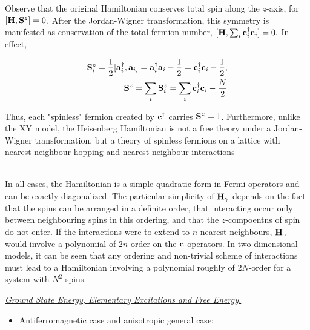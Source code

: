 \documentclass{homework}
\begin{document}
\begin{tcolorbox}[colback = yellow, title = Physical Context]

Observe that the original Hamiltonian conserves total spin along the $z$-axis, for $[{\bf H}, {\bf S}^z] = 0$. After the Jordan-Wigner transformation, this symmetry is manifested as conservation of the total fermion number, $[{\bf H}, \sum_{i} {\bf c}_i^\dagger {\bf c}_i] = 0.$ 
In effect, 

\begin{equation}
    \begin{split}
        {\bf S}_i^z = \frac{1}{2} [{\bf a}_i^\dagger, {\bf a}_i] = {\bf a}_i^\dagger {\bf a}_i - \frac{1}{2} = {\bf c}_i^\dagger {\bf c}_i - \frac{1}{2}, \\
        {\bf S}^z = \sum_{i} {\bf S}_i^z = \sum_{i} {\bf c}_i^\dagger {\bf c}_i - \frac{N}{2}
    \end{split}
\end{equation}

Thus, each "spinless" fermion created by ${\bf c}^\dagger$ carries ${\bf S}^z = 1$. Furthermore, unlike the XY model, the Heisenberg Hamiltonian is not a free theory under a Jordan-Wigner transformation, but a theory of spinless fermions on a lattice with nearest-neighbour hopping and nearest-neighbour interactions 
\end{tcolorbox}

\blanky \\ 

In all cases, the Hamiltonian is a simple quadratic form in Fermi operators and can be exactly diagonalized. The particular simplicity of ${\bf H}_{\gamma}$ depends on the fact that the spins can be arranged in a definite order, that interacting occur only between neighbouring spins in this ordering, and that the $z$-compoentns of spin do not enter. If the interactions were to extend to $n$-nearest neighbours, ${\bf H}_{\gamma}$ would involve a polynomial of $2n$-order on the ${\bf c}$-operators. In two-dimensional models, it can be seen that any ordering and non-trivial scheme of interactions must lead to a Hamiltonian involving a polynomial roughly of $2N$-order for a system with $N^2$
spins. 

\clearpage

\textit{\underline{Ground State Energy, Elementary Excitations and Free Energy. }}

\begin{itemize}
    \item Antiferromagnetic case and anisotropic general case:
\end{itemize}
\end{document}
